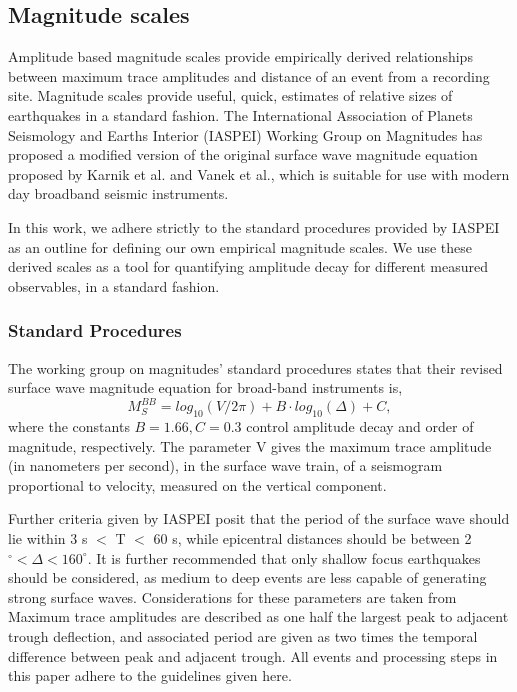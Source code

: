 \documentclass{gji}
\begin{document}
\subsection{Magnitude scales}
Amplitude based magnitude scales provide empirically derived relationships between maximum trace amplitudes and distance of an event from a recording site. Magnitude scales provide useful, quick, estimates of relative sizes of earthquakes in a standard fashion. 
The International Association of Planets Seismology and Earths Interior (IASPEI) Working Group on Magnitudes has proposed a modified version of the original surface wave magnitude equation proposed by Karnik et al. and Vanek et al., %
which is suitable for use with modern day broadband seismic instruments. 

In this work, we adhere strictly to the standard procedures provided by IASPEI as an outline for defining our own empirical magnitude scales. We use these derived scales as a tool for quantifying amplitude decay for different measured observables, in a standard fashion.

\subsubsection{Standard Procedures}
The working group on magnitudes' standard procedures states that their revised surface wave magnitude equation for broad-band instruments is,
\begin{equation}\label{eq:mag}
	M_S^{BB} = log_{10}(V/2\pi) + B\cdot log_{10}(\Delta) + C, 
\end{equation}
where the constants $B=1.66, C=0.3$ control amplitude decay and order of magnitude, respectively. The parameter V gives the maximum trace amplitude (in nanometers per second), in the surface wave train, of a seismogram proportional to velocity, measured on the vertical component. 

Further criteria given by IASPEI posit that the period of the surface wave should lie within 3 s $<$ T $<$ 60 s, while epicentral distances should be between 2$^\circ < \Delta < 160^\circ$. It is further recommended that only shallow focus earthquakes should be considered, as medium to deep events are less capable of generating strong surface waves. Considerations for these parameters are taken from %
Maximum trace amplitudes are described as one half the largest peak to adjacent trough deflection, and associated period are given as two times the temporal difference between peak and adjacent trough. All events and processing steps in this paper adhere to the guidelines given here.
\end{document}
